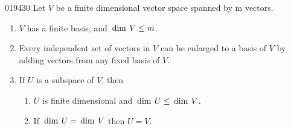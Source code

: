 \begin{theorem}{}{019430}
Let $V$ be a finite dimensional vector space spanned by m vectors.

\begin{enumerate}
\item $V$ has a finite basis, and $\thinspace\operatorname{dim\medspace} V \leq m$.

\item Every independent set of vectors in $V$ can be enlarged to a basis of $V$ by adding vectors from any fixed basis of $V$.

\item If $U$ is a subspace of $V$, then

\begin{enumerate}[label={\alph*.}]
\item $U$ is finite dimensional and $\thinspace\operatorname{dim\medspace} U \leq \thinspace\operatorname{dim\medspace} V$.

\item If $\thinspace\operatorname{dim\medspace} U = \thinspace\operatorname{dim\medspace} V$ then $U=V$. 

\end{enumerate}
\end{enumerate}
\end{theorem}

